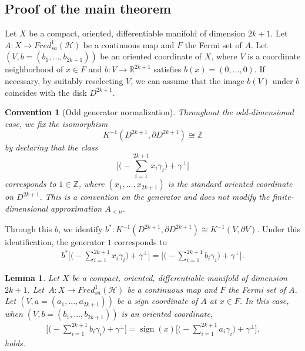 \documentclass{amsart}
\newtheorem{lem}[thm]{Lemma}
\newtheorem{convention}[thm]{Convention}
\theoremstyle{definition}
\theoremstyle{remark}
\begin{document}
\subsection{Proof of the main theorem}
\label{sub:Proof of the main theorem}


Let $X$ be a compact, oriented, differentiable manifold of dimension $2k+1$. Let \,$A\colon X\to Fred_{sa}^1(\mathcal{H})$ be a continuous map and $F$ the Fermi set of $A$. Let $(V, b = (b_1, \dots, b_{2k+1}))$ be an oriented coordinate of $X$, where $V$ is a coordinate neighborhood of $x \in F$ and $b: V \to \mathbb{R}^{2k+1}$ satisfies $b(x) = (0, \dots, 0)$. If necessary, by suitably reselecting $V$, we can assume that the image $b(V)$ under $b$ coincides with the disk $D^{2k+1}$.

\begin{convention}[Odd generator normalization]\label{conv:odd-generator}
Throughout the odd-dimensional case, we fix the isomorphism
\[
K^{-1}(D^{2k+1},\partial D^{2k+1})\cong \mathbb{Z}
\]
by declaring that the class
\[
\Big[\Big(-\sum_{i=1}^{2k+1} x_i \gamma_i\Big)+\gamma^{\perp}\Big]
\]
corresponds to \(1\in\mathbb{Z}\), where \((x_1,\dots,x_{2k+1})\) is the standard oriented coordinate on \(D^{2k+1}\).
This is a convention on the generator and does not modify the finite-dimensional approximation \(A_{<\mu}\).
\end{convention}

Through this $b$, we identify $b^*\colon K^{-1}(D^{2k+1},\partial D^{2k+1}) \cong K^{-1}(V, \partial V).$ Under this identification, the generator $1$ corresponds to 
\begin{align*}
b^*\Big[\Big(-\sum_{i=1}^{2k+1}x_i\gamma_i\Big) + \gamma^{\perp}\Big]
=
\Big[\Big(-\sum_{i=1}^{2k+1}b_i\gamma_i\Big) + \gamma^{\perp}\Big].
\end{align*}

\begin{lem}\label{lem:4.12}
Let $X$ be a compact, oriented, differentiable manifold of dimension $2k+1$. Let \,$A\colon X\to Fred_{sa}^1(\mathcal{H})$ be a continuous map and $F$ the Fermi set of $A$. Let $(V,a=(a_{1},...,a_{2k+1}))$ be a sign coordinate of $A$ at $x\in F$.
In this case, when $(V,b=(b_{1},...,b_{2k+1}))$ is an oriented coordinate,
\begin{align*}
\Big[\Big(-\sum_{i=1}^{2k+1}b_i\gamma_i\Big) + \gamma^{\perp}\Big]
=
\operatorname{sign}(x)\Big[\Big(-\sum_{i=1}^{2k+1}a_i\gamma_i\Big) + \gamma^{\perp}\Big].
\end{align*}
holds.
\end{lem}
\end{document}

